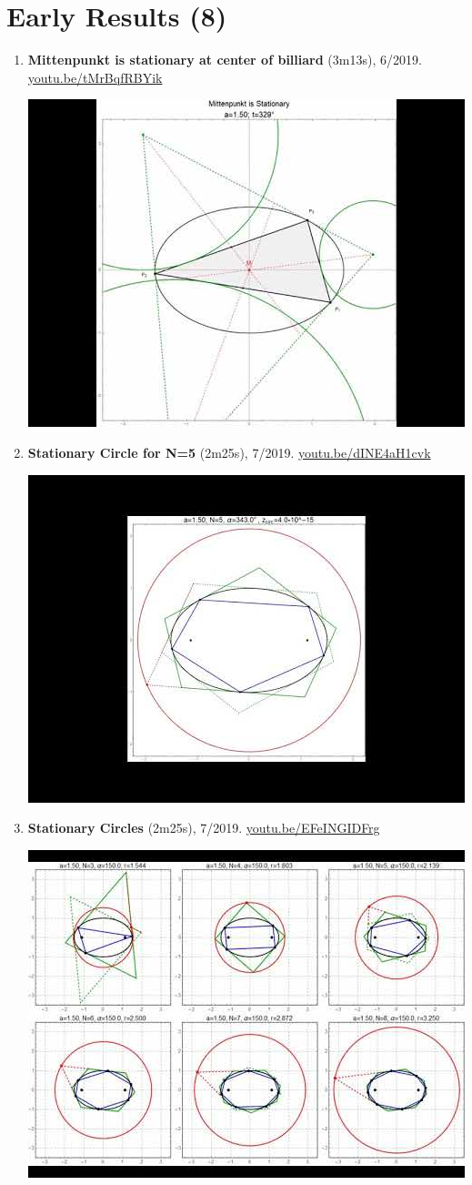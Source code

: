 \documentclass[12pt]{article}
\begin{document}
\section{Early Results (8)}

\begin{enumerate}[resume]
\item \textbf{Mittenpunkt is stationary at center of billiard} (3m13s), 6/2019. \href{https://youtu.be/tMrBqfRBYik}{\url{youtu.be/tMrBqfRBYik}}
\begin{center}\includegraphics[width=.5\textwidth]{pics/tMrBqfRBYik.jpg}\end{center}
% 
\item \textbf{Stationary Circle for N=5} (2m25s), 7/2019. \href{https://youtu.be/dINE4aH1cvk}{\url{youtu.be/dINE4aH1cvk}}
\begin{center}\includegraphics[width=.5\textwidth]{pics/dINE4aH1cvk.jpg}\end{center}
% 
\item \textbf{Stationary Circles} (2m25s), 7/2019. \href{https://youtu.be/EFeINGIDFrg}{\url{youtu.be/EFeINGIDFrg}}
\begin{center}\includegraphics[width=.5\textwidth]{pics/EFeINGIDFrg.jpg}\end{center}

\end{enumerate}
\end{document}

